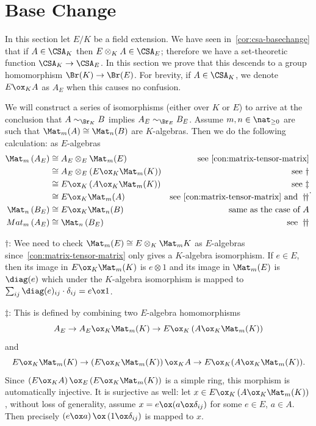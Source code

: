 \section{Base Change}
In this section let $E/K$ be a field extension. We have seen in~\cref{cor:csa-basechange} that if $A\in\CSA_{K}$ then $E\otimes_{K}A\in\CSA_{E}$; therefore we have a set-theoretic function $\CSA_{K}\to\CSA_{E}$. In this section we prove that this descends to a group homomorphism $\Br(K)\to\Br(E)$. For brevity, if $A\in \CSA_{K}$, we denote $E\ox_{K}A$ as $A_{E}$ when this causes no confusion.
\begin{construction}
  \label{con:br-base-change}
  We will construct a series of isomorphisms (either over $K$ or $E$) to arrive at the conclusion that $A\sim_{\Br_{K}}B$ implies $A_{E}\sim_{\Br_{E}}B_{E}$. Assume $m,n\in\nat_{\ge0}$ are such that $\Mat_{m}(A)\cong\Mat_{n}(B)$ are $K$-algebras. Then we do the following calculation: as $E$-algebras
  \[
    \begin{aligned}
      \Mat_{m}\left(A_{E}\right)
      &\cong A_{E}\otimes_{E}\Mat_{m}(E) &\text{see~\cref{con:matrix-tensor-matrix}}\\
      &\cong A_{E}\otimes_{E}\left(E\ox_{K} \Mat_{m}(K)\right) & \text{see}~\dagger\\
      &\cong E \ox_{K}\left(A\ox_{K}\Mat_{m}(K)\right) &\text{see}~\ddagger\\
      &\cong E\ox_{K}\Mat_{m}(A) &\text{see~\cref{con:matrix-tensor-matrix} and}~\dagger\!\!\dagger \\
      \Mat_{n}\left(B_{E}\right) &\cong E\ox_{K}\Mat_{n}(B) &\text{same as the case of}~A\\
      Mat_{m}\left(A_{E}\right)&\cong \Mat_{n}\left(B_{E}\right) &\text{see}~\dagger\!\!\dagger
    \end{aligned}.
  \]

   \noindent$\dagger$: Wee need to check $\Mat_{m}(E)\cong E\otimes_{K}\Mat_{m}K$ as $E$-algebras since~\cref{con:matrix-tensor-matrix} only gives a $K$-algebra isomorphism. If $e \in E$, then its image in $E\ox_{K}\Mat_{m}(K)$ is $e\otimes 1$ and its image in $\Mat_{m}(E)$ is $\diag(e)$ which under the $K$-algebra isomorphism is mapped to $\sum_{ij}\diag(e)_{ij}\cdot \delta_{ij}=e\ox1$.

   \noindent$\ddagger$: This is defined by combining two $E$-algebra homomorphisms
   \[
     A_{E}\to A_{E}\ox_{K}\Mat_{m}(K)\to E\ox_{K}\left(A\ox_{K}\Mat_{m}(K)\right)\]
     and
     \[
       E\ox_{K}\Mat_{m}(K)\to \left(E\ox_{K}\Mat_{m}(K)\right)\ox_{K}A \to E\ox_{K}(A\ox_{K}\Mat_{m}(K)).
    \]
   Since $\left(E\ox_{K}A\right)\ox_{E}\left(E\ox_{K}\Mat_{m}(K)\right)$ is a simple ring, this morphism is automatically injective. It is surjective as well: let $x\in E\ox_{K}\left(A\ox_{K}\Mat_{m}(K)\right)$, without loss of generality, assume $x=e\ox (a\ox\delta_{ij})$ for some $e\in E$, $a\in A$. Then precisely $\left(e\ox a\right)\ox\left(1\ox\delta_{ij}\right)$ is mapped to $x$.


\end{construction}
